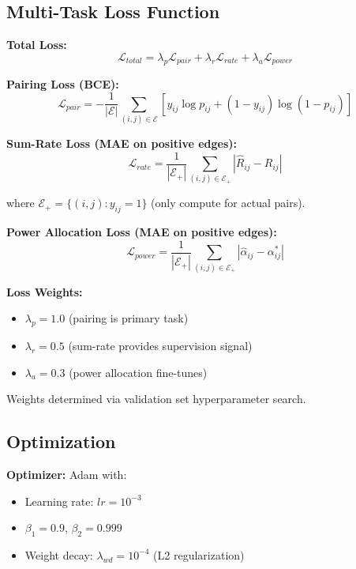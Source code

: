 \subsection{Multi-Task Loss Function}

\textbf{Total Loss:}
\begin{equation}
\mathcal{L}_{total} = \lambda_p \mathcal{L}_{pair} + \lambda_r \mathcal{L}_{rate} + \lambda_a \mathcal{L}_{power}
\end{equation}

\textbf{Pairing Loss (BCE):}
\begin{equation}
\mathcal{L}_{pair} = -\frac{1}{|\mathcal{E}|} \sum_{(i,j) \in \mathcal{E}} \left[ y_{ij} \log p_{ij} + (1-y_{ij}) \log(1-p_{ij}) \right]
\end{equation}

\textbf{Sum-Rate Loss (MAE on positive edges):}
\begin{equation}
\mathcal{L}_{rate} = \frac{1}{|\mathcal{E}_+|} \sum_{(i,j) \in \mathcal{E}_+} |\hat{R}_{ij} - R_{ij}|
\end{equation}

where $\mathcal{E}_+ = \{(i,j) : y_{ij} = 1\}$ (only compute for actual pairs).

\textbf{Power Allocation Loss (MAE on positive edges):}
\begin{equation}
\mathcal{L}_{power} = \frac{1}{|\mathcal{E}_+|} \sum_{(i,j) \in \mathcal{E}_+} |\hat{\alpha}_{ij} - \alpha_{ij}^*|
\end{equation}

\textbf{Loss Weights:}
\begin{itemize}
    \item $\lambda_p = 1.0$ (pairing is primary task)
    \item $\lambda_r = 0.5$ (sum-rate provides supervision signal)
    \item $\lambda_a = 0.3$ (power allocation fine-tunes)
\end{itemize}

Weights determined via validation set hyperparameter search.

\subsection{Optimization}

\textbf{Optimizer:} Adam with:
\begin{itemize}
    \item Learning rate: $lr = 10^{-3}$
    \item $\beta_1 = 0.9$, $\beta_2 = 0.999$
    \item Weight decay: $\lambda_{wd} = 10^{-4}$ (L2 regularization)
\end{itemize}

